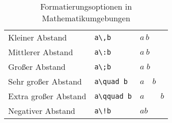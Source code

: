 \begin{table}[h]
\begin{tabular}{lll}
        Kleiner Abstand                      & \texttt{a\textbackslash ,b}                         & \( a\,b \)               \\
        Mittlerer Abstand                    & \texttt{a\textbackslash :b}                         & \( a\: b \)              \\
        Großer Abstand                       & \texttt{a\textbackslash ;b}                         & \( a\;b \)               \\
        Sehr großer Abstand                  & \texttt{a\textbackslash quad b}                     & \( a \quad b \)          \\
        Extra großer Abstand                 & \texttt{a\textbackslash qquad b}                    & \( a \qquad b \)         \\
        Negativer Abstand                    & \texttt{a\textbackslash!b}                          & \( a\!b \)               \\
        \bottomrule
    \end{tabular}
    \caption{Formatierungsoptionen in Mathematikumgebungen}
    \label{tab:math_formatierung}
\end{table}
